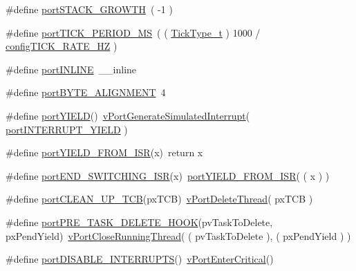 \begin{DoxyCompactItemize}
\item 
\#define \hyperlink{MSVC-MingW_2portmacro_8h_a21adaab1601f6a0f35ba550a43060830}{port\-S\-T\-A\-C\-K\-\_\-\-G\-R\-O\-W\-T\-H}~( -\/1 )
\item 
\#define \hyperlink{MSVC-MingW_2portmacro_8h_a554d9322ce7f698a86a22b21234bd8cd}{port\-T\-I\-C\-K\-\_\-\-P\-E\-R\-I\-O\-D\-\_\-\-M\-S}~( ( \hyperlink{Flsh186_2prtmacro_8h_aa69c48c6e902ce54f70886e6573c92a9}{Tick\-Type\-\_\-t} ) 1000 / \hyperlink{FreeRTOSConfig_8h_a2f0258dd1e3b877e5bc013be54c2db6a}{config\-T\-I\-C\-K\-\_\-\-R\-A\-T\-E\-\_\-\-H\-Z} )
\item 
\#define \hyperlink{MSVC-MingW_2portmacro_8h_a73448585c9c9e96500c2f0c9ea824601}{port\-I\-N\-L\-I\-N\-E}~\-\_\-\-\_\-inline
\item 
\#define \hyperlink{MSVC-MingW_2portmacro_8h_ab9091ce3940d8bd93ec850122a2c6a1c}{port\-B\-Y\-T\-E\-\_\-\-A\-L\-I\-G\-N\-M\-E\-N\-T}~4
\item 
\#define \hyperlink{MSVC-MingW_2portmacro_8h_ae1ff06193615f5130b5a97dc9e708fc7}{port\-Y\-I\-E\-L\-D}()~\hyperlink{MSVC-MingW_2port_8c_a42248a1986691ed4d9344fd75789d69c}{v\-Port\-Generate\-Simulated\-Interrupt}( \hyperlink{MSVC-MingW_2portmacro_8h_ae86b9ac3969c84a0e5db6d2debeba7cb}{port\-I\-N\-T\-E\-R\-R\-U\-P\-T\-\_\-\-Y\-I\-E\-L\-D} )
\item 
\#define \hyperlink{MSVC-MingW_2portmacro_8h_aac6850c66595efdc02a8bbb95fb4648e}{port\-Y\-I\-E\-L\-D\-\_\-\-F\-R\-O\-M\-\_\-\-I\-S\-R}(x)~return x
\item 
\#define \hyperlink{MSVC-MingW_2portmacro_8h_abf055ad6643e8ac35fc843c8e55d9db6}{port\-E\-N\-D\-\_\-\-S\-W\-I\-T\-C\-H\-I\-N\-G\-\_\-\-I\-S\-R}(x)~\hyperlink{Tasking_2ARM__CM4F_2portmacro_8h_aac6850c66595efdc02a8bbb95fb4648e}{port\-Y\-I\-E\-L\-D\-\_\-\-F\-R\-O\-M\-\_\-\-I\-S\-R}( ( x ) )
\item 
\#define \hyperlink{MSVC-MingW_2portmacro_8h_a3c506bf351102047fb5a75491287fe69}{port\-C\-L\-E\-A\-N\-\_\-\-U\-P\-\_\-\-T\-C\-B}(px\-T\-C\-B)~\hyperlink{MSVC-MingW_2portmacro_8h_a0ff38519b01649ce7a5c6a2d91204940}{v\-Port\-Delete\-Thread}( px\-T\-C\-B )
\item 
\#define \hyperlink{MSVC-MingW_2portmacro_8h_aa97aebf8d800e651ca46e021b55c7fa0}{port\-P\-R\-E\-\_\-\-T\-A\-S\-K\-\_\-\-D\-E\-L\-E\-T\-E\-\_\-\-H\-O\-O\-K}(pv\-Task\-To\-Delete, px\-Pend\-Yield)~\hyperlink{MSVC-MingW_2portmacro_8h_ad3564ae551c470eeb87262ed6c2f3cee}{v\-Port\-Close\-Running\-Thread}( ( pv\-Task\-To\-Delete ), ( px\-Pend\-Yield ) )
\item 
\#define \hyperlink{MSVC-MingW_2portmacro_8h_a6e3d10ee1a0734a647ca192523c2cfc1}{port\-D\-I\-S\-A\-B\-L\-E\-\_\-\-I\-N\-T\-E\-R\-R\-U\-P\-T\-S}()~\hyperlink{Tasking_2ARM__CM4F_2portmacro_8h_a2ed3554a3de09a3bd09d396ee081ab69}{v\-Port\-Enter\-Critical}()

\end{DoxyCompactItemize}
